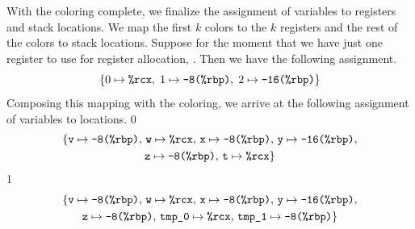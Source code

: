 \documentclass[7x10]{TimesAPriori_MIT}%
\def\racketEd{0}
\def\pythonEd{1}
\def\edition{1}
\newcommand{\pythonColor}[0]{}
\numberwithin{theorem}{chapter}
\numberwithin{definition}{chapter}
\numberwithin{equation}{chapter}
\begin{document}
With the coloring complete, we finalize the assignment of variables to
registers and stack locations. We map the first $k$ colors to the $k$
registers and the rest of the colors to stack locations.  Suppose for
the moment that we have just one register to use for register
allocation, . Then we have the following assignment.
\[
  \{ 0 \mapsto \texttt{\%rcx}, \; 1 \mapsto \texttt{-8(\%rbp)}, \; 2 \mapsto \texttt{-16(\%rbp)} \}
\]
Composing this mapping with the coloring, we arrive at the following
assignment of variables to locations.
{\if\edition\racketEd      
\begin{gather*}
  \{ \text{\texttt{v}} \mapsto \texttt{-8(\%rbp)}, \,
     \text{\texttt{w}} \mapsto \texttt{\%rcx},  \,
     \text{\texttt{x}} \mapsto \texttt{-8(\%rbp)}, \,
     \text{\texttt{y}} \mapsto \texttt{-16(\%rbp)}, \\
     \text{\texttt{z}} \mapsto \texttt{-8(\%rbp)}, \,
     \text{\texttt{t}} \mapsto \texttt{\%rcx} \}
\end{gather*}
\fi}
{\if\edition\pythonEd\pythonColor
\begin{gather*}
  \{ \text{\texttt{v}} \mapsto \texttt{-8(\%rbp)},  \,
     \text{\texttt{w}} \mapsto \texttt{\%rcx}, \,
     \text{\texttt{x}} \mapsto \texttt{-8(\%rbp)}, \,
     \text{\texttt{y}} \mapsto \texttt{-16(\%rbp)}, \\
     \text{\texttt{z}} \mapsto \texttt{-8(\%rbp)}, \,
     \text{\texttt{tmp\_0}} \mapsto \texttt{\%rcx}, \,
     \text{\texttt{tmp\_1}} \mapsto \texttt{-8(\%rbp)} \}
\end{gather*}
\fi}
\end{document}
